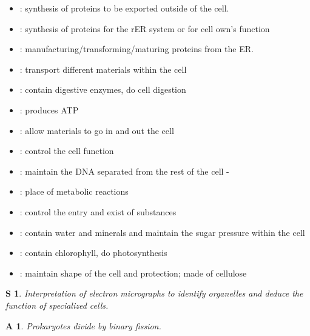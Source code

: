 \documentclass[12pt, a4paper]{article}
\newtheorem{skl}{S}[subsection]
\newtheorem{app}{A}[subsection]
\begin{document}
\begin{itemize}
    \item \textbf{\color{red}{Rough endoplasmic reticulum (rER)}}: synthesis of proteins to be exported outside of the cell. 
    \item \textbf{\color{red}{Ribosomes}}: synthesis of proteins for the rER system or for cell own's function
    \item \textbf{\color{red}{Golgi apparatus}}: manufacturing/transforming/maturing proteins from the ER. 
    \item \textbf{\color{red}{Vesicles}}: transport different materials within the cell
    \item \textbf{\color{red}{Lysosome}}: contain digestive enzymes, do cell digestion
    \item \textbf{\color{red}{Mitochondria}}: produces ATP
    \item \textbf{\color{red}{Nuclear pore}}: allow materials to go in and out the cell
    \item \textbf{\color{red}{DNA}}: control the cell function
    \item \textbf{\color{red}{Nuclear envelope}}: maintain the DNA separated from the rest of the cell - {\color{blue}{DNA cannot survive in the cytoplasm.}}
    \item \textbf{\color{red}{Cytoplasm}}: place of metabolic reactions
    \item \textbf{\color{red}{Plasma membrane}}: control the entry and exist of substances
    \item \textbf{\color{red}{Large/Central vacuole}}: contain water and minerals and maintain the sugar pressure within the cell
    \item \textbf{\color{red}{Chloroplast}}: contain chlorophyll, do photosynthesis
    \item \textbf{\color{red}{Cell Wall}}: maintain shape of the cell and protection; made of cellulose
\end{itemize}
{\color{blue}{N.B.: Large/central vacuole, chloroplast, and call wall are special organelles that are only contained in plant cells. }}
\begin{skl}
    Interpretation of electron micrographs to identify organelles and deduce the function of specialized cells.
\end{skl}
\begin{app}
    Prokaryotes divide by binary fission.
\end{app}
\end{document}

